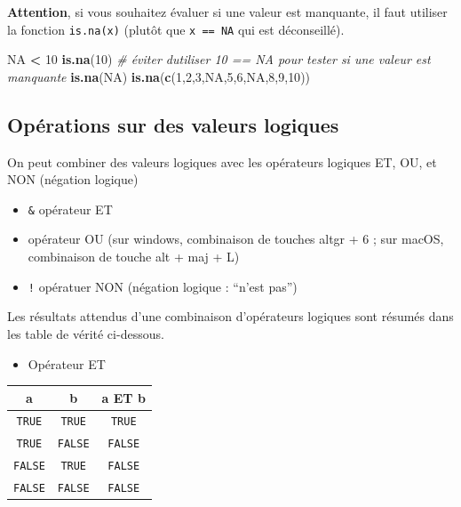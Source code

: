 \documentclass[
]{book}
\newenvironment{Shaded}{\begin{snugshade}}{\end{snugshade}}
\newcommand{\CommentTok}[1]{\textcolor[rgb]{0.56,0.35,0.01}{\textit{#1}}}
\newcommand{\ConstantTok}[1]{\textcolor[rgb]{0.56,0.35,0.01}{#1}}
\newcommand{\DecValTok}[1]{\textcolor[rgb]{0.00,0.00,0.81}{#1}}
\newcommand{\FunctionTok}[1]{\textcolor[rgb]{0.13,0.29,0.53}{\textbf{#1}}}
\newcommand{\NormalTok}[1]{#1}
\newcommand{\SpecialCharTok}[1]{\textcolor[rgb]{0.81,0.36,0.00}{\textbf{#1}}}
\providecommand{\tightlist}{%
  \setlength{\itemsep}{0pt}\setlength{\parskip}{0pt}}
\begin{document}
\textbf{Attention}, si vous souhaitez évaluer si une valeur est manquante, il faut utiliser la fonction \texttt{is.na(x)} (plutôt que \texttt{x\ ==\ NA} qui est déconseillé).

\begin{Shaded}
\begin{Highlighting}[]
\ConstantTok{NA} \SpecialCharTok{\textless{}} \DecValTok{10}
\FunctionTok{is.na}\NormalTok{(}\DecValTok{10}\NormalTok{) }\CommentTok{\# éviter d\textquotesingle{}utiliser 10 == NA pour tester si une valeur est manquante}
\FunctionTok{is.na}\NormalTok{(}\ConstantTok{NA}\NormalTok{)}
\FunctionTok{is.na}\NormalTok{(}\FunctionTok{c}\NormalTok{(}\DecValTok{1}\NormalTok{,}\DecValTok{2}\NormalTok{,}\DecValTok{3}\NormalTok{,}\ConstantTok{NA}\NormalTok{,}\DecValTok{5}\NormalTok{,}\DecValTok{6}\NormalTok{,}\ConstantTok{NA}\NormalTok{,}\DecValTok{8}\NormalTok{,}\DecValTok{9}\NormalTok{,}\DecValTok{10}\NormalTok{))}
\end{Highlighting}
\end{Shaded}

\subsection{Opérations sur des valeurs logiques}\label{opuxe9rations-sur-des-valeurs-logiques}

On peut combiner des valeurs logiques avec les opérateurs logiques ET, OU, et NON (négation logique)

\begin{itemize}
\tightlist
\item
  \texttt{\&} opérateur ET
\item
  \texttt{\textbar{}} opérateur OU (sur windows, combinaison de touches altgr + 6 ; sur macOS, combinaison de touche alt + maj + L)
\item
  \texttt{!} opératuer NON (négation logique : ``n'est pas'')
\end{itemize}

Les résultats attendus d'une combinaison d'opérateurs logiques sont résumés dans les table de vérité ci-dessous.

\begin{itemize}
\tightlist
\item
  Opérateur ET
\end{itemize}

\begin{longtable}[]{@{}ccc@{}}
\toprule\noalign{}
a & b & a ET b \\
\midrule\noalign{}
\endhead
\bottomrule\noalign{}
\endlastfoot
\texttt{TRUE} & \texttt{TRUE} & \texttt{TRUE} \\
\texttt{TRUE} & \texttt{FALSE} & \texttt{FALSE} \\
\texttt{FALSE} & \texttt{TRUE} & \texttt{FALSE} \\
\texttt{FALSE} & \texttt{FALSE} & \texttt{FALSE} \\
\end{longtable}
\end{document}
